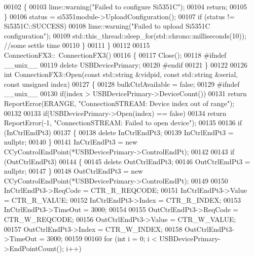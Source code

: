 \begin{DoxyCode}
00102         \{
00103             lime::warning(\textcolor{stringliteral}{"Failed to configure Si5351C"});
00104             \textcolor{keywordflow}{return};
00105         \}
00106         status = si5351module->UploadConfiguration();
00107         \textcolor{keywordflow}{if} (status != Si5351C::SUCCESS)
00108             lime::warning(\textcolor{stringliteral}{"Failed to upload Si5351C configuration"});
00109         std::this\_thread::sleep\_for(std::chrono::milliseconds(10)); \textcolor{comment}{//some settle time}
00110     \}
00111 \}
00112 
00115 ConnectionFX3::~ConnectionFX3()
00116 \{
00117     Close();
00118 \textcolor{preprocessor}{#ifndef \_\_unix\_\_}
00119     \textcolor{keyword}{delete} USBDevicePrimary;
00120 \textcolor{preprocessor}{#endif}
00121 \}
00122 
00126 \textcolor{keywordtype}{int} ConnectionFX3::Open(\textcolor{keyword}{const} std::string &vidpid, \textcolor{keyword}{const} std::string &serial, \textcolor{keyword}{const} \textcolor{keywordtype}{unsigned} 
      index)
00127 \{
00128     bulkCtrlAvailable = \textcolor{keyword}{false};
00129 \textcolor{preprocessor}{#ifndef \_\_unix\_\_}
00130     \textcolor{keywordflow}{if}(index > USBDevicePrimary->DeviceCount())
00131         \textcolor{keywordflow}{return} ReportError(ERANGE, \textcolor{stringliteral}{"ConnectionSTREAM: Device index out of range"});
00132 
00133     \textcolor{keywordflow}{if}(USBDevicePrimary->Open(index) == \textcolor{keyword}{false})
00134         \textcolor{keywordflow}{return} ReportError(-1, \textcolor{stringliteral}{"ConnectionSTREAM: Failed to open device"});
00135 
00136     \textcolor{keywordflow}{if} (InCtrlEndPt3)
00137     \{
00138         \textcolor{keyword}{delete} InCtrlEndPt3;
00139         InCtrlEndPt3 = \textcolor{keyword}{nullptr};
00140     \}
00141     InCtrlEndPt3 = \textcolor{keyword}{new} CCyControlEndPoint(*USBDevicePrimary->ControlEndPt);
00142 
00143     \textcolor{keywordflow}{if} (OutCtrlEndPt3)
00144     \{
00145         \textcolor{keyword}{delete} OutCtrlEndPt3;
00146         OutCtrlEndPt3 = \textcolor{keyword}{nullptr};
00147     \}
00148     OutCtrlEndPt3 = \textcolor{keyword}{new} CCyControlEndPoint(*USBDevicePrimary->ControlEndPt);
00149 
00150     InCtrlEndPt3->ReqCode = CTR_R_REQCODE;
00151     InCtrlEndPt3->Value = CTR_R_VALUE;
00152     InCtrlEndPt3->Index = CTR_R_INDEX;
00153     InCtrlEndPt3->TimeOut = 3000;
00154 
00155     OutCtrlEndPt3->ReqCode = CTR_W_REQCODE;
00156     OutCtrlEndPt3->Value = CTR_W_VALUE;
00157     OutCtrlEndPt3->Index = CTR_W_INDEX;
00158     OutCtrlEndPt3->TimeOut = 3000;
00159 
00160     \textcolor{keywordflow}{for} (\textcolor{keywordtype}{int} i = 0; i < USBDevicePrimary->EndPointCount(); i++)

\end{DoxyCode}
